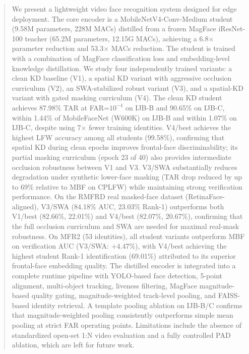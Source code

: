 \begin{abstract}
We present a lightweight video face recognition system designed for edge deployment. The core encoder is a MobileNetV4-Conv-Medium student (9.58M parameters, 228M MACs) distilled from a frozen MagFace iResNet-100 teacher (65.2M parameters, 12.15G MACs), achieving a 6.8$\times$ parameter reduction and 53.3$\times$ MACs reduction. The student is trained with a combination of MagFace classification loss and embedding-level knowledge distillation. We study four independently trained variants: a clean KD baseline (V1), a spatial KD variant with aggressive occlusion curriculum (V2), an SWA-stabilized robust variant (V3), and a spatial-KD variant with gated masking curriculum (V4). The clean KD student achieves 87.98\% TAR at FAR=$10^{-4}$ on IJB-B and 90.65\% on IJB-C, within 1.44\% of MobileFaceNet (W600K) on IJB-B and within 1.07\% on IJB-C, despite using 7$\times$ fewer training identities. V4/best achieves the highest LFW accuracy among all students (99.58\%), confirming that spatial KD during clean epochs improves frontal-face discriminability; its partial masking curriculum (epoch 23 of 40) also provides intermediate occlusion robustness between V1 and V3. V3/SWA substantially reduces degradation under synthetic lower-face masking (TAR drop reduced by up to 69\% relative to MBF on CPLFW) while maintaining strong verification performance. On the RMFRD real masked-face dataset (RetinaFace-aligned), V3/SWA (84.18\% AUC, 23.03\% Rank-1) outperforms both V1/best (82.66\%, 22.01\%) and V4/best (82.07\%, 20.67\%), confirming that the full occlusion curriculum and SWA are needed for maximal real-mask robustness. On MFR2 (53 identities), all student variants outperform MBF on verification AUC (V3/SWA: $+4.47\%$), with V4/best achieving the highest student Rank-1 identification (69.01\%) attributed to its superior frontal-face embedding quality. The distilled encoder is integrated into a complete runtime pipeline with YOLO-based face detection, 5-point alignment, multi-object tracking, liveness filtering, MagFace magnitude-based quality gating, magnitude-weighted track-level pooling, and FAISS-based identity retrieval. A template pooling ablation on IJB-B/C confirms that magnitude-weighted pooling consistently outperforms simple mean pooling at strict FAR operating points. Limitations include the absence of standardized open-set 1:N video evaluation and a fully controlled PAD ablation, which are left for future work.
\end{abstract}
